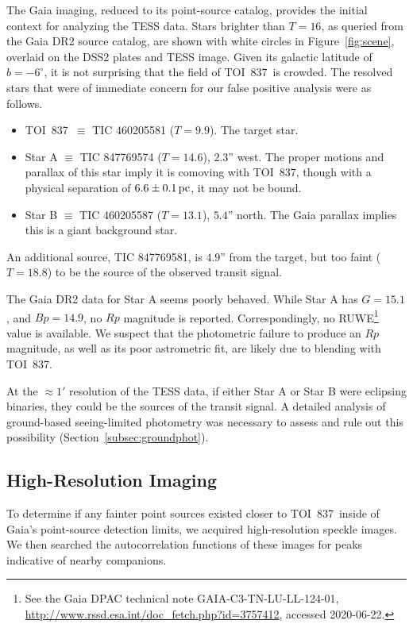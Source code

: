 \documentclass[12pt,twocolumn,tighten]{aastex63}
\newcommand{\tn}{TOI~837} %
\begin{document}
The Gaia imaging, reduced to its point-source catalog, provides
the initial context for analyzing the TESS data.  Stars brighter than
$T=16$, as queried from the Gaia DR2 source catalog, are shown with
white circles in Figure~\ref{fig:scene}, overlaid on the DSS2 plates
and TESS image.  Given its galactic latitude of $b=-6^\circ$, it is
not surprising that the field of \tn\ is crowded.  The resolved stars
that were of immediate concern for our false positive analysis were as
follows.
\begin{itemize}
  \item \tn\ $\equiv$ TIC 460205581 ($T=9.9$). The target star.
  \item Star A $\equiv$ TIC 847769574 ($T=14.6$), $2.3$'' west. The
    proper motions and parallax of this star imply it is comoving with
    \tn, though with a physical separation of $6.6\pm 0.1\,{\rm pc}$,
    it may not be bound.
  \item Star B $\equiv$ TIC 460205587 ($T=13.1$), $5.4$'' north.  The
    Gaia parallax implies this is a giant background star.
\end{itemize}
An additional source, TIC 847769581, is $4.9$'' from the target, but
too faint ($T=18.8$) to be the source of the observed transit signal.

The Gaia DR2 data for Star A seems poorly behaved.  While Star A has
$G=15.1$, and $Bp=14.9$, no $Rp$ magnitude is reported.
Correspondingly, no RUWE\footnote{ See the Gaia DPAC technical note
GAIA-C3-TN-LU-LL-124-01,
\url{http://www.rssd.esa.int/doc_fetch.php?id=3757412}, accessed
2020-06-22. } value is available.  We suspect that the photometric
failure to produce an $Rp$ magnitude, as well as its poor astrometric
fit, are likely due to blending with \tn.

At the $\approx1'$ resolution of the TESS data, if either Star A or
Star B were eclipsing binaries, they could be the sources of the
transit signal.  A detailed analysis of ground-based seeing-limited
photometry was necessary to assess and rule out this possibility
(Section~\ref{subsec:groundphot}).


\subsection{High-Resolution Imaging}
\label{subsec:speckle}

To determine if any fainter point sources existed closer to \tn\
inside of Gaia's point-source detection limits, we acquired
high-resolution speckle images. We then searched the autocorrelation
functions of these images for peaks indicative of nearby companions.
\end{document}

